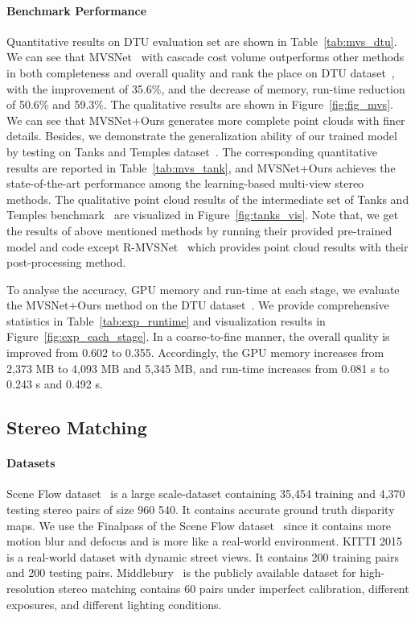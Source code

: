 \documentclass[10pt,twocolumn,letterpaper]{article}
\begin{document}
\paragraph{Benchmark Performance}\vspace{-1mm}
Quantitative results on DTU evaluation set \cite{aanaes2016dtu} are shown in Table~\ref{tab:mvs_dtu}.
We can see that MVSNet~\cite{yao2018mvsnet} with cascade cost volume outperforms other methods~\cite{chen2019point, Luo_2019_ICCV, yao2018mvsnet, yao2019recurrent} in both completeness and overall quality and rank the  place on DTU dataset~\cite{aanaes2016dtu}, with the improvement of 35.6\%, and the decrease of memory, run-time reduction of 50.6\% and 59.3\%.
The qualitative results are shown in Figure~\ref{fig:fig_mvs}.
We can see that MVSNet+Ours generates more complete point clouds with finer details. Besides, we demonstrate the generalization ability of our trained model by testing on Tanks and Temples dataset~\cite{knapitsch2017tanks}.
The corresponding quantitative results are reported in Table~\ref{tab:mvs_tank}, and  MVSNet+Ours achieves the state-of-the-art performance among the learning-based multi-view stereo methods.
The qualitative point cloud results of the intermediate set of Tanks and Temples benchmark~\cite{knapitsch2017tanks} are visualized in Figure~\ref{fig:tanks_vis}.
Note that, we get the results of above mentioned methods by running their provided pre-trained model and code except R-MVSNet~\cite{yao2019recurrent} which provides point cloud results with their post-processing method. 

To analyse the accuracy, GPU memory and run-time at each stage, we evaluate the MVSNet+Ours method on the DTU dataset~\cite{aanaes2016dtu}.
We provide comprehensive statistics in Table~\ref{tab:exp_runtime} and visualization results in Figure~\ref{fig:exp_each_stage}.
In a coarse-to-fine manner, the overall quality is improved from 0.602 to 0.355.
Accordingly, the GPU memory increases from 2,373 MB to 4,093 MB and 5,345 MB,
and run-time increases from 0.081 s to 0.243 s and 0.492 s. 






\subsection{Stereo Matching} 
\paragraph{Datasets}
Scene Flow dataset~\cite{mayer2016large} is a large scale-dataset containing 35,454 training and 4,370 testing stereo pairs of size 960  540.
It contains accurate ground truth disparity maps.
We use the Finalpass of the Scene Flow dataset~\cite{mayer2016large} since it contains more motion blur and defocus and is more like a real-world environment.
KITTI 2015~\cite{menze2015object} is a real-world dataset with dynamic street views.
It contains 200 training pairs and 200 testing pairs. Middlebury~\cite{middle} is the publicly available dataset for high-resolution stereo matching contains 60 pairs under imperfect calibration, different exposures, and different lighting conditions.
\end{document}
